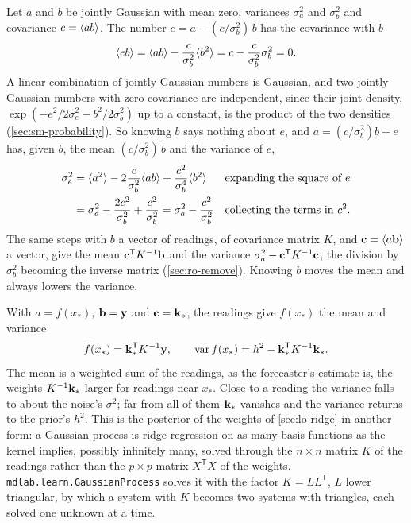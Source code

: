 \begin{toolbox}
Let $a$ and $b$ be jointly Gaussian with mean zero, variances
$\sigma_a^2$ and $\sigma_b^2$ and covariance $c = \langle ab \rangle$. The number
$e = a - (c/\sigma_b^2)\,b$ has the covariance with $b$
\begin{equation*}
   \langle eb \rangle = \langle ab \rangle - \frac{c}{\sigma_b^2}\langle b^2 \rangle
   = c - \frac{c}{\sigma_b^2}\sigma_b^2 = 0 .
\end{equation*}
A linear combination of jointly Gaussian numbers is Gaussian, and two
jointly Gaussian numbers with zero covariance are independent, since
their joint density, $\exp(-e^2/2\sigma_e^2 - b^2/2\sigma_b^2)$ up to a
constant, is the product of the two densities (\cref{sec:sm-probability}).
So knowing $b$ says nothing about $e$, and $a = (c/\sigma_b^2)b + e$ has,
given $b$, the mean $(c/\sigma_b^2)\,b$ and the variance of $e$,
\begin{align*}
   \sigma_e^2 &= \langle a^2 \rangle - 2\frac{c}{\sigma_b^2}\langle ab \rangle
      + \frac{c^2}{\sigma_b^4}\langle b^2 \rangle
      && \text{expanding the square of $e$}\\
   &= \sigma_a^2 - \frac{2c^2}{\sigma_b^2} + \frac{c^2}{\sigma_b^2}
   = \sigma_a^2 - \frac{c^2}{\sigma_b^2}
      && \text{collecting the terms in $c^2$.}
\end{align*}
The same steps with $b$ a vector of readings, of covariance matrix
$K$, and $\bm{\mathrm{c}} = \langle a\bm{\mathrm{b}} \rangle$ a vector, give the mean $\bm{\mathrm{c}}^{\mathsf
T}K^{-1}\bm{\mathrm{b}}$ and the variance $\sigma_a^2 - \bm{\mathrm{c}}^{\mathsf
T}K^{-1}\bm{\mathrm{c}}$, the division by $\sigma_b^2$ becoming the inverse matrix
(\cref{sec:ro-remove}). Knowing $b$ moves the mean and always lowers
the variance.
\end{toolbox}

\noindent With $a = f(x_\ast)$, $\bm{\mathrm{b}} = \bm{\mathrm{y}}$ and $\bm{\mathrm{c}} =
\bm{\mathrm{k}}_\ast$, the readings give $f(x_\ast)$ the mean and variance
\begin{equation}
   \bar f(x_\ast) = \bm{\mathrm{k}}_\ast^{\mathsf T}K^{-1}\bm{\mathrm{y}} , \qquad
   \operatorname{var} f(x_\ast) = h^2 - \bm{\mathrm{k}}_\ast^{\mathsf T}K^{-1}
   \bm{\mathrm{k}}_\ast .
   \label{eq:lo-gp}
\end{equation}
The mean is a weighted sum of the readings, as the forecaster's estimate
is, the weights $K^{-1}\bm{\mathrm{k}}_\ast$ larger for readings near $x_\ast$.
Close to a reading the variance falls to about the noise's $\sigma^2$;
far from all of them $\bm{\mathrm{k}}_\ast$ vanishes and the variance returns to
the prior's $h^2$. This is the posterior of the weights of
\cref{sec:lo-ridge} in another form: a Gaussian process is ridge
regression on as many basis functions as the kernel implies, possibly
infinitely many, solved through the $n\times n$ matrix $K$ of the
readings rather than the $p\times p$ matrix $X^{\mathsf T}X$ of the
weights\cite{Rasmussen2006}. \texttt{mdlab.learn.GaussianProcess} solves
it with the factor $K = LL^{\mathsf T}$, $L$ lower triangular, by which a
system with $K$ becomes two systems with triangles, each solved one
unknown at a time.

